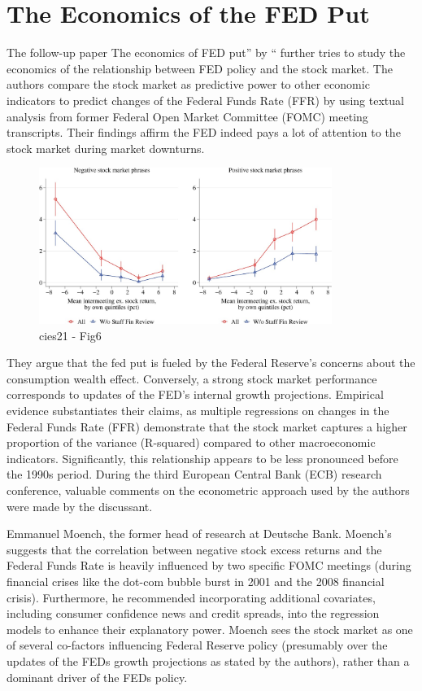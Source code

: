 \section{The Economics of the FED Put}

The follow-up paper The economics of FED put” by \parencite{cieslak_economics_2021}“ further tries to study the economics of the relationship between FED policy and the stock market. 
The authors compare the stock market as predictive power to other economic indicators to predict changes of the Federal Funds Rate (FFR) by using textual analysis from former Federal Open Market Committee (FOMC) meeting transcripts.
Their findings affirm the FED indeed pays a lot of attention to the stock market during market downturns.

\begin{figure}[h]
    \centering
    \includegraphics[width=0.85\textwidth]{figures/cies21/Figure6}
    \caption{cies21 - Fig6}
\end{figure}


They argue that the fed put is fueled by the Federal Reserve's concerns about the consumption wealth effect. Conversely, a strong stock market performance corresponds to updates of the FED’s internal growth projections.
Empirical evidence substantiates their claims, as multiple regressions on changes in the Federal Funds Rate (FFR) demonstrate that the stock market captures a higher proportion of the variance (R-squared) compared to other macroeconomic indicators. Significantly, this relationship appears to be less pronounced before the 1990s period.
During the third European Central Bank (ECB) research conference, valuable comments on the econometric approach used by the authors were made by the discussant.

 Emmanuel Moench, the former head of research at Deutsche Bank. Moench's suggests that the correlation between negative stock excess returns and the Federal Funds Rate is heavily influenced by two specific FOMC meetings (during financial crises like the dot-com bubble burst in 2001 and the 2008 financial crisis).
Furthermore, he recommended incorporating additional covariates, including consumer confidence news and credit spreads, into the regression models to enhance their explanatory power. Moench sees the stock market as one of several co-factors influencing Federal Reserve policy (presumably over the updates of the FEDs growth projections as stated by the authors), rather than a dominant driver of the FEDs policy.




